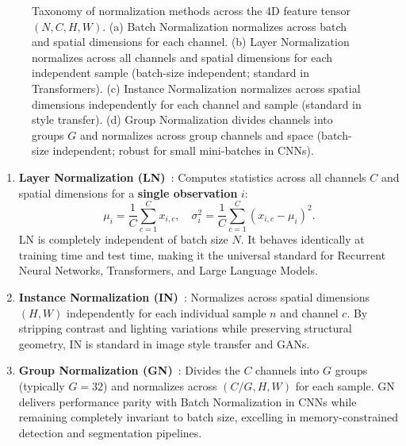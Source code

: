 \begin{figure}[H]
\caption{Taxonomy of normalization methods across the 4D feature tensor $(N, C, H, W)$. (a) Batch Normalization normalizes across batch and spatial dimensions for each channel. (b) Layer Normalization normalizes across all channels and spatial dimensions for each independent sample (batch-size independent; standard in Transformers). (c) Instance Normalization normalizes across spatial dimensions independently for each channel and sample (standard in style transfer). (d) Group Normalization divides channels into groups $G$ and normalizes across group channels and space (batch-size independent; robust for small mini-batches in CNNs).}
\label{fig:normalization_taxonomy_3d}
\end{figure}

\begin{enumerate}[leftmargin=*]
  \item \textbf{Layer Normalization (LN)}~\cite{ba2016layer}: Computes statistics across all channels $C$ and spatial dimensions for a \textbf{single observation} $i$:
    \begin{equation}
    \mu_i = \frac{1}{C} \sum_{c=1}^C x_{i, c}, \quad \sigma_i^2 = \frac{1}{C} \sum_{c=1}^C (x_{i, c} - \mu_i)^2.
    \end{equation}
    LN is completely independent of batch size $N$. It behaves identically at training time and test time, making it the universal standard for Recurrent Neural Networks, Transformers, and Large Language Models.
  \item \textbf{Instance Normalization (IN)}~\cite{ulyanov2016instance}: Normalizes across spatial dimensions $(H, W)$ independently for each individual sample $n$ and channel $c$. By stripping contrast and lighting variations while preserving structural geometry, IN is standard in image style transfer and GANs.
  \item \textbf{Group Normalization (GN)}~\cite{wu2018group}: Divides the $C$ channels into $G$ groups (typically $G = 32$) and normalizes across $(C/G, H, W)$ for each sample. GN delivers performance parity with Batch Normalization in CNNs while remaining completely invariant to batch size, excelling in memory-constrained detection and segmentation pipelines.
\end{enumerate}

